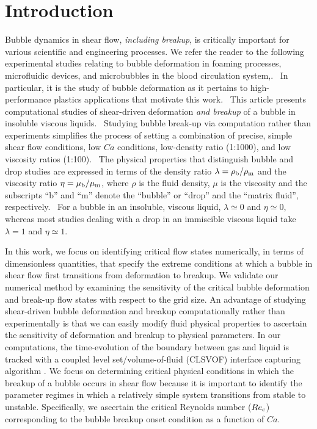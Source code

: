 \documentclass[review]{elsarticle}
\begin{document}
\section{Introduction}

%
%
Bubble dynamics in shear flow, {\em including breakup}, is critically important for various scientific and engineering processes. We refer the reader to the following experimental studies relating to bubble deformation in foaming processes, microfluidic devices, and microbubbles in the blood circulation system,\cite{ChuFinBouAtaHamPug19,MulTobDreFisWin08,BenRodFauPinFerPerGarMirLim18,DreSai15}.  In particular, it is the study of bubble deformation as it pertains to high-performance plastics applications that motivate this work.  This article presents computational studies of shear-driven deformation {\em and breakup} of a bubble in insoluble viscous liquids.  Studying bubble break-up via computation rather than experiments simplifies the process of setting a combination of precise, simple shear flow conditions, low $Ca$ conditions, low-density ratio (1:1000), and low viscosity ratios (1:100).  The physical properties that distinguish bubble and drop studies are expressed in terms of the density ratio $\lambda = \rho_{\rm b} / \rho_{\rm m}$ and the viscosity ratio $\eta = \mu_{\rm b} / \mu_{\rm m}$, where $\rho$ is the fluid density, $\mu$ is the viscosity and the subscripts ``b'' and ``m'' denote the ``bubble'' or ``drop'' and the ``matrix fluid'', respectively.  For a bubble in an insoluble, viscous liquid, $\lambda \simeq 0$ and $\eta \simeq 0$, whereas most studies dealing with a drop in an immiscible viscous liquid take $\lambda =1$ and $\eta \simeq 1$.  

In this work, we focus on identifying critical flow states numerically, in terms of dimensionless quantities, that specify the extreme conditions at which a bubble in shear flow first transitions from deformation to breakup.  We validate our numerical method by examining the sensitivity of the critical bubble deformation and break-up flow states with respect to the grid size.  An advantage of studying shear-driven bubble deformation and breakup computationally rather than experimentally is that we can easily modify fluid physical properties to ascertain the sensitivity of deformation and breakup to physical parameters.  In our computations, the time-evolution of the boundary between gas and liquid is tracked with a coupled level set/volume-of-fluid (CLSVOF) interface capturing algorithm \cite{SusPuc00,SUSSMAN2007469}.  We focus on determining critical physical conditions in which the breakup of a bubble occurs in shear flow because it is important to identify the parameter regimes in which a relatively simple system transitions from stable to unstable.  Specifically, we ascertain the critical Reynolds number ($Re_{\rm c}$) corresponding to the bubble breakup onset condition as a function of $Ca$.          
\end{document}
